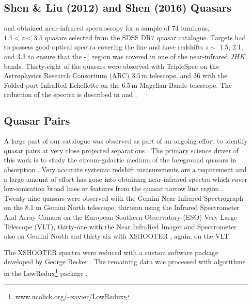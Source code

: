 \subsection{Shen \& Liu (2012) and Shen (2016) Quasars}

\citet{shen16a} and \citet{shen12} obtained near-infrared spectroscopy for a sample of 74 luminous, $1.5 < z < 3.5$ quasars selected from the SDSS DR7 quasar catalogue. 
Targets had to possess good optical spectra covering the  line and have redshifts $z\sim$ 1.5, 2.1, and 3.3 to ensure that the \hbns-[] region was covered in one of the near-infrared $JHK$ bands.
Thirty-eight of the quasars were observed with TripleSpec \citep{wilson04} on the Astrophysics Research Consortium (ARC) 3.5\,m telescope, and 36 with the Folded-port InfraRed Echellette \citep[FIRE;][]{simcoe10} on the 6.5\,m Magellan-Baade telescope.
The reduction of the spectra is described in \citet{shen16a} and \citet{shen12}. 

\subsection{Quasar Pairs}

A large part of our catalogue was observed as part of an ongoing effort to identify quasar pairs at very close projected separations \citep[Quasars Probing Quasars\footnote{www.ucolick.org/\textasciitilde xavier/QPQ/Quasars\_Probing\_Quasars} (QPQ);][]{hennawi06a,hennawi10}. 
The primary science driver of this work is to study the circum-galactic medium of the foreground quasars in absorption \citep{hennawi06b}.
Very accurate systemic redshift measurements are a requirement and a large amount of effort has gone into obtaining near-infrared spectra which cover low-ionisation broad lines or features from the quasar narrow line region \citep{prochaska09,lau16,hennawi15}. 
Twenty-nine quasars were observed with the Gemini Near-Infrared Spectrograph \citep[GNIRS;][]{elias06} on the 8.1 m Gemini North telescope, thirtenn using the Infrared Spectrometer And Array Camera \citep[ISAAC;][]{moorwood98b} on the European Southern Observatory (ESO) Very Large Telescope (VLT), thirty-one with the Near InfraRed Imager and Spectrometer \citep[NIRI;][]{hodapp03} also on Gemini North and thirty-six with XSHOOTER \citep{vernet11}, again, on the VLT. 

The  XSHOOTER  spectra  were  reduced  with  a  custom  software  package  developed  by  George  Becker \citep[for details, see][]{lau16}. 
The remaining data was processed with algorithms in the LowRedux\footnote{www.ucolick.org/\textasciitilde xavier/LowRedux} package \citep[see][]{prochaska09}.

